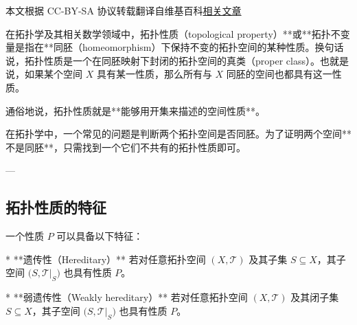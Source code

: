 
本文根据 CC-BY-SA 协议转载翻译自维基百科\href{https://en.wikipedia.org/wiki/Topological_property}{相关文章}

在拓扑学及其相关数学领域中，拓扑性质（topological property）**或**拓扑不变量是指在**同胚（homeomorphism）\*\*下保持不变的拓扑空间的某种性质。换句话说，拓扑性质是一个在同胚映射下封闭的拓扑空间的真类（proper class）。也就是说，如果某个空间 $X$ 具有某一性质，那么所有与 $X$ 同胚的空间也都具有这一性质。

通俗地说，拓扑性质就是**能够用开集来描述的空间性质**。

在拓扑学中，一个常见的问题是判断两个拓扑空间是否同胚。为了证明两个空间**不是同胚**，只需找到一个它们不共有的拓扑性质即可。

---

\subsection{拓扑性质的特征}

一个性质 $P$ 可以具备以下特征：

* **遗传性（Hereditary）**
  若对任意拓扑空间 $(X, \mathcal{T})$ 及其子集 $S \subseteq X$，其子空间 $\bigl(S, \mathcal{T}|_S\bigr)$ 也具有性质 $P$。

* **弱遗传性（Weakly hereditary）**
  若对任意拓扑空间 $(X, \mathcal{T})$ 及其闭子集 $S \subseteq X$，其子空间 $\bigl(S, \mathcal{T}|_S\bigr)$ 也具有性质 $P$。
